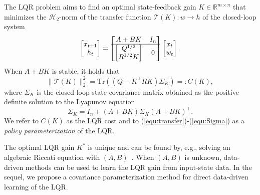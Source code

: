     The LQR problem aims to find an optimal state-feedback gain $K\in \mathbb{R}^{m\times n}$ that minimizes the $\mathcal{H}_2$-norm of the transfer function $\mathscr{T}(K):w \rightarrow h$ of the closed-loop system
	\begin{equation}
	\begin{bmatrix}
	x_{t+1}  \\
	h_{t} 
	\end{bmatrix}=\begin{bmatrix}
	A+BK & I_n \\
	\hline \begin{bmatrix}
	Q^{1 / 2} \\
	R^{1 / 2} K
	\end{bmatrix} & 0
	\end{bmatrix}\begin{bmatrix}
	x_{t}  \\
	w_{t} 
	\end{bmatrix}.
	\end{equation}
	When $A+BK$ is stable, it holds that \cite{anderson2007optimal}
	\begin{equation}\label{equ:transfer}
	\|\mathscr{T}(K)\|_2^2  = \text{Tr}((Q+K^{\top}RK)\Sigma_K)=:C(K),
	\end{equation}
	where $\Sigma_K$ is the closed-loop state covariance matrix obtained as the positive definite solution to the Lyapunov equation
	\begin{equation}\label{equ:Sigma}
	\Sigma_K = I_n + (A+BK)\Sigma_K (A+BK)^{\top}.
	\end{equation}
	We refer to $C(K)$ as the LQR cost and to (\ref{equ:transfer})-(\ref{equ:Sigma}) as a \textit{policy parameterization} of the LQR.

The optimal LQR gain $K^*$ is unique and can be found by, e.g., solving an algebraic Riccati equation with $(A,B)$~\cite{anderson2007optimal}. When $(A,B)$ is unknown, data-driven methods can be used to learn the LQR gain from input-state data. In the sequel, we propose a covariance parameterization method for direct data-driven learning of the LQR.

